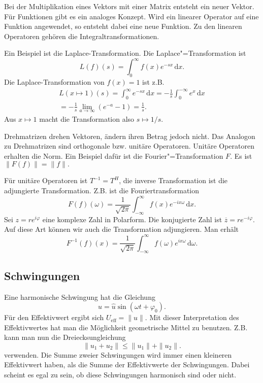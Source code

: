 \documentclass[a4paper,10pt,fleqn,twocolumn,twoside]{article}
\begin{document}
Bei der Multiplikation eines Vektors mit einer Matrix entsteht ein
neuer Vektor. Für Funktionen gibt es ein analoges Konzept. Wird ein
linearer Operator auf eine Funktion angewendet, so entsteht dabei
eine neue Funktion. Zu den linearen Operatoren gehören die
Integraltransformationen.

Ein Beispiel ist die Laplace-Transformation.
Die Laplace"=Transformation ist
\[L(f)(s) = \int_0^{\infty} f(x)e^{-sx}\,\mathrm dx.\]
Die Laplace-Transformation von $f(x)=1$ ist z.B.
\begin{gather*}
L(x\mapsto 1)(s) = \int_0^{\infty} e^{-sx}\,\mathrm dx
= -\frac{1}{s} \int_0^{-\infty} e^x\,\mathrm dx\\
= -\frac{1}{s} \lim_{a\rightarrow\infty} (e^{-a}-1)
= \frac{1}{s}.
\end{gather*}
Aus $x\mapsto 1$ macht die Transformation also
$s\mapsto 1/s$.



Drehmatrizen drehen Vektoren, ändern ihren Betrag jedoch nicht.
Das Analogon zu Drehmatrizen sind orthogonale bzw. unitäre Operatoren.
Unitäre Operatoren erhalten die Norm. Ein Beispiel dafür ist die
Fourier"=Transformation $F$. Es ist $\|F(f)\| = \|f\|.$

Für unitäre Operatoren ist $T^{-1}=T^H$, die inverse Transformation
ist die adjungierte Transformation. Z.B. ist die Fouriertransformation
\[F(f)(\omega) = \frac{1}{\sqrt{2\pi}}
\int_{-\infty}^{\infty} f(x)e^{-ix\omega}\,\mathrm dx.\]
Sei $z=re^{i\varphi}$ eine komplexe Zahl in Polarform.
Die konjugierte Zahl ist
$\overline z = re^{-i\varphi}$. Auf diese Art können wir auch
die Transformation adjungieren. Man erhält
\[F^{-1}(f)(x) = \frac{1}{\sqrt{2\pi}}
\int_{-\infty}^{\infty} f(\omega)e^{ix\omega}\,\mathrm d\omega.\]

\subsection{Schwingungen}

Eine harmonische Schwingung hat die Gleichung
\[u=\hat u\sin(\omega t+\varphi_0).\]
Für den Effektivwert ergibt sich $U_\mathrm{eff} = \|u\|$.
Mit dieser Interpretation des Effektivwertes hat man die Möglichkeit
geometrische Mittel zu benutzen. Z.B. kann man nun die
Dreiecksungleichung
\[\|u_1+u_2\| \le \|u_1\|+\|u_2\|.\]
verwenden. Die Summe zweier Schwingungen wird immer einen kleineren
Effektivwert haben, als die Summe der Effektivwerte der Schwingungen.
Dabei scheint es egal zu sein, ob diese Schwingungen harmonisch sind
oder nicht.
\end{document}
